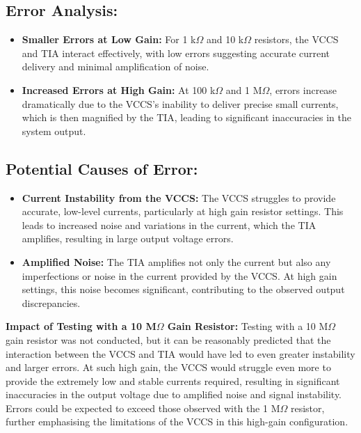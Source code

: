 \documentclass[conference]{IEEEtran}
\begin{document}
\subsection{Error Analysis:}

\begin{itemize}
    \item \textbf{Smaller Errors at Low Gain:} For 1 k$\Omega$ and 10 k$\Omega$ resistors, the VCCS and TIA interact effectively, with low errors suggesting accurate current delivery and minimal amplification of noise.
    \item \textbf{Increased Errors at High Gain:} At 100 k$\Omega$ and 1 M$\Omega$, errors increase dramatically due to the VCCS’s inability to deliver precise small currents, which is then magnified by the TIA, leading to significant inaccuracies in the system output.\\
\end{itemize}


\subsection{Potential Causes of Error:}

\begin{itemize}
    \item \textbf{Current Instability from the VCCS:} The VCCS struggles to provide accurate, low-level currents, particularly at high gain resistor settings. This leads to increased noise and variations in the current, which the TIA amplifies, resulting in large output voltage errors.
    \item \textbf{Amplified Noise:} The TIA amplifies not only the current but also any imperfections or noise in the current provided by the VCCS. At high gain settings, this noise becomes significant, contributing to the observed output discrepancies.\\
\end{itemize}


\textbf{Impact of Testing with a 10 M$\Omega$ Gain Resistor:} Testing with a 10 M$\Omega$ gain resistor was not conducted, but it can be reasonably predicted that the interaction between the VCCS and TIA would have led to even greater instability and larger errors. At such high gain, the VCCS would struggle even more to provide the extremely low and stable currents required, resulting in significant inaccuracies in the output voltage due to amplified noise and signal instability. Errors could be expected to exceed those observed with the 1 M$\Omega$ resistor, further emphasising the limitations of the VCCS in this high-gain configuration.\\
\end{document}

